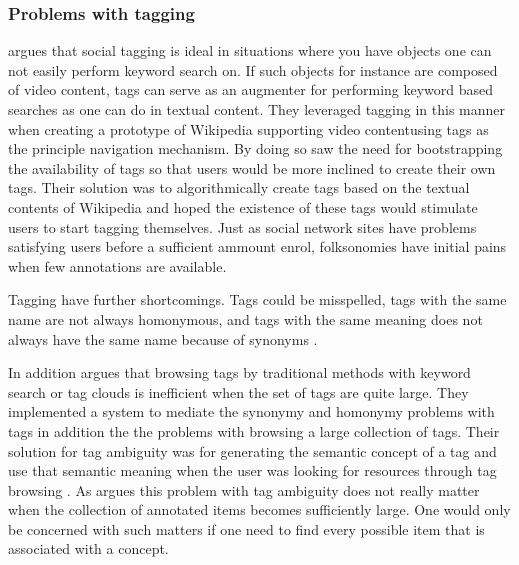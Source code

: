 \subsubsection{Problems with tagging}

\citet[]{fokker06} argues that social tagging is ideal in situations
where you have objects one can not easily perform keyword search on.
If such objects for instance are composed of video content, tags
can serve as an augmenter for performing keyword based searches as one can
do in textual content. They leveraged tagging in this manner when creating a
prototype of Wikipedia supporting video content\dash{}using tags as the
principle navigation mechanism. By doing so \citet[]{fokker06}
saw the need for bootstrapping the availability of tags so that users would be
more inclined to create their own tags. Their solution was to algorithmically
create tags based on the textual contents of Wikipedia and hoped the existence
of these tags would stimulate users to start tagging themselves. Just as
social network sites have problems satisfying users before a
sufficient ammount enrol, folksonomies have initial pains when
few annotations are available.

Tagging have further shortcomings. Tags could be misspelled, tags with the
same name are not always  homonymous, and tags with the same meaning does not
always have the same name because of synonyms \citep[]{aurnhammer06}.

In addition \citet[]{li07} argues that browsing tags by traditional
methods with keyword search or tag clouds is inefficient when the set of tags
are quite large. They implemented a system to mediate the synonymy and
homonymy problems with tags in addition the the problems with browsing a large
collection of tags. Their solution for tag ambiguity
was for generating the semantic concept%
of a tag and use that semantic meaning
when the user was looking for resources through tag browsing
\citep[]{li07}.
As \citet[]{weinberger07} argues this problem
with tag ambiguity does not really matter when the collection of annotated
items becomes sufficiently large. One would only be concerned with such
matters if one need to find every possible item that is associated with a
concept.

